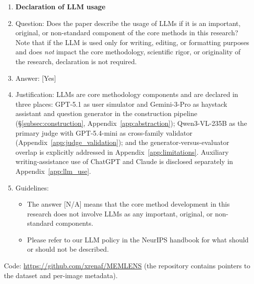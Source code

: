 \documentclass{llmxive}
\providecommand{\answerYes}[1][]{[Yes]#1}
\providecommand{\answerNA}[1][]{[N/A]#1}
\begin{document}
\begin{enumerate}
\item {\bf Declaration of LLM usage}
    \item[] Question: Does the paper describe the usage of LLMs if it is an important, original, or non-standard component of the core methods in this research? Note that if the LLM is used only for writing, editing, or formatting purposes and does \emph{not} impact the core methodology, scientific rigor, or originality of the research, declaration is not required.
    \item[] Answer: \answerYes{}
    \item[] Justification: LLMs are core methodology components and are declared in three places: GPT-5.1 as user simulator and Gemini-3-Pro as haystack assistant and question generator in the construction pipeline (\S\ref{subsec:construction}, Appendix~\ref{app:abstraction}); Qwen3-VL-235B as the primary judge with GPT-5.4-mini as cross-family validator (Appendix~\ref{app:judge_validation}); and the generator-versus-evaluator overlap is explicitly addressed in Appendix~\ref{app:limitations}. Auxiliary writing-assistance use of ChatGPT and Claude is disclosed separately in Appendix~\ref{app:llm_use}.
    \item[] Guidelines:
    \begin{itemize}
        \item The answer \answerNA{} means that the core method development in this research does not involve LLMs as any important, original, or non-standard components.
        \item Please refer to our LLM policy in the NeurIPS handbook for what should or should not be described.
    \end{itemize}

\end{enumerate}
\fi %

\bigskip
\noindent Code: \url{https://github.com/xrenaf/MEMLENS} (the repository contains pointers to the dataset and per-image metadata).
\end{document}

